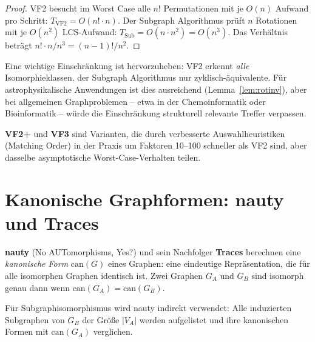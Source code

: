 ﻿\documentclass[a4paper,12pt]{report}
\theoremstyle{definition}
\begin{document}
\begin{proof}
VF2 besucht im Worst Case alle $n!$ Permutationen mit je $O(n)$ Aufwand pro Schritt: $T_\mathrm{VF2} = O(n! \cdot n)$. Der Subgraph Algorithmus prüft $n$ Rotationen mit je $O(n^2)$ LCS-Aufwand: $T_\mathrm{Sub} = O(n \cdot n^2) = O(n^3)$. Das Verhältnis beträgt $n! \cdot n / n^3 = (n-1)! / n^2$.
\end{proof}

Eine wichtige Einschränkung ist hervorzuheben: VF2 erkennt \emph{alle} Isomorphieklassen, der Subgraph Algorithmus nur zyklisch-äquivalente. Für astrophysikalische Anwendungen ist dies ausreichend (Lemma~\ref{lem:rotinv}), aber bei allgemeinen Graphproblemen -- etwa in der Chemoinformatik oder Bioinformatik -- würde die Einschränkung strukturell relevante Treffer verpassen.

\textbf{VF2+} \cite{vf2plus2015} und \textbf{VF3} \cite{vf3_2018} sind Varianten, die durch verbesserte Auswahlheuristiken (Matching Order) in der Praxis um Faktoren 10--100 schneller als VF2 sind, aber dasselbe asymptotische Worst-Case-Verhalten teilen.

\section{Kanonische Graphformen: nauty und Traces}
\label{sec:related_nauty}

\textbf{nauty} (No AUTomorphisms, Yes?) \cite{mckay2014} und sein Nachfolger \textbf{Traces} berechnen eine \emph{kanonische Form} $\mathrm{can}(G)$ eines Graphen: eine eindeutige Repräsentation, die für alle isomorphen Graphen identisch ist. Zwei Graphen $G_A$ und $G_B$ sind isomorph genau dann wenn $\mathrm{can}(G_A) = \mathrm{can}(G_B)$.

Für Subgraphisomorphismus wird nauty indirekt verwendet: Alle induzierten Subgraphen von $G_B$ der Größe $|V_A|$ werden aufgelistet und ihre kanonischen Formen mit $\mathrm{can}(G_A)$ verglichen.
\end{document}
